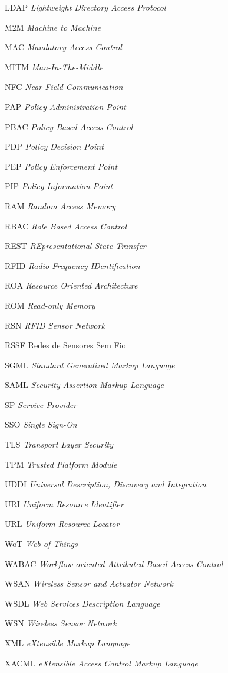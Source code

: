 \begin{siglas}
\item[LDAP]{\textit{Lightweight Directory Access Protocol}}	
\item[M2M]{\textit{Machine to Machine}}
\item[MAC]{\textit{Mandatory Access Control}}
\item[MITM]{\textit{Man-In-The-Middle}}
\item[NFC]{\textit{Near-Field Communication}}
\item[PAP]{\textit{Policy Administration Point}}
\item[PBAC]{\textit{Policy-Based Access Control}}
\item[PDP]{\textit{Policy Decision Point}}
\item[PEP]{\textit{Policy Enforcement Point}}
\item[PIP]{\textit{Policy Information Point}}
\item[RAM]{\textit{Random Access Memory}}
\item[RBAC]{\textit{Role Based Access Control}}
\item[REST]{\textit{REpresentational State Transfer}}
\item[RFID]{\textit{Radio-Frequency IDentification}}
\item[ROA]{\textit{Resource Oriented Architecture}}
\item[ROM]{\textit{Read-only Memory}}
\item[RSN]{\textit{RFID Sensor Network}}
\item[RSSF]{Redes de Sensores Sem Fio}
\item[SGML]{\textit{Standard Generalized Markup Language}}
\item[SAML]{\textit{Security Assertion Markup Language}}
\item[SP]{\textit{Service Provider}}
\item[SSO]{\textit{Single Sign-On}}
\item[TLS]{\textit{Transport Layer Security}}
\item[TPM]{\textit{Trusted Platform Module}}
\item[UDDI]{\textit{Universal Description, Discovery and Integration}}
\item[URI]{\textit{Uniform Resource Identifier}}
\item[URL]{\textit{Uniform Resource Locator}}
\item[WoT]{\textit{Web of Things}}
\item[WABAC]{\textit{Workflow-oriented Attributed Based Access Control}}
\item[WSAN]{\textit{Wireless Sensor and Actuator Network}}
\item[WSDL]{\textit{Web Services Description Language}}
\item[WSN]{\textit{Wireless Sensor Network}}
\item[XML]{\textit{eXtensible Markup Language}}
\item[XACML]{\textit{eXtensible Access Control Markup Language}}	
\end{siglas}